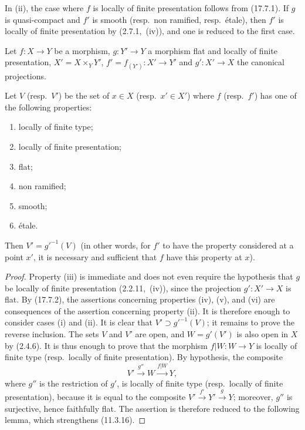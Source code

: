 In (ii), the case where $f$ is locally of finite presentation follows from (17.7.1).
If $g$ is quasi-compact and $f'$ is smooth (resp.\ non ramified, resp.\ \'etale), then $f'$ is locally of finite presentation by (2.7.1,~(iv)), and one is reduced to the first case.

\begin{proposition}[17.7.4]
\label{IV.17.7.4}
Let $f:X\to Y$ be a morphism, $g:Y'\to Y$ a morphism flat and locally of finite presentation, $X'=X\times_Y Y'$, $f'=f_{(Y')}:X'\to Y'$ and $g':X'\to X$ the canonical projections.


Let $V$ (resp.\ $V'$) be the set of $x\in X$ (resp.\ $x'\in X'$) where $f$ (resp.\ $f'$) has one of the following properties:
\begin{enumerate}[label=(\roman*)]
  \item locally of finite type;
  \item locally of finite presentation;
  \item flat;
  \item non ramified;
  \item smooth;
  \item \'etale.
\end{enumerate}
Then $V'=g'^{-1}(V)$ (in other words, for $f'$ to have the property considered at a point $x'$, it is necessary and sufficient that $f$ have this property at $x$).
\end{proposition}

\begin{proof}
Property (iii) is immediate and does not even require the hypothesis that $g$ be locally of finite presentation (2.2.11,~(iv)), since the projection $g':X'\to X$ is flat.
By (17.7.2), the assertions concerning properties (iv), (v), and (vi) are consequences of the assertion concerning property (ii).
It is therefore enough to consider cases (i) and (ii).
It is clear that $V'\supset g'^{-1}(V)$; it remains to prove the reverse inclusion.
The sets $V$ and $V'$ are open, and $W=g'(V')$ is also open in $X$ by (2.4.6).
It is thus enough to prove that the morphism $f|W:W\to Y$ is locally of finite type (resp.\ locally of finite presentation).
By hypothesis, the composite
\[
V'\xrightarrow{g''}W\xrightarrow{f|W}Y,
\]
where $g''$ is the restriction of $g'$, is locally of finite type (resp.\ locally of finite presentation), because it is equal to the composite $V'\xrightarrow{f'}Y'\xrightarrow{g}Y$; moreover, $g''$ is surjective, hence faithfully flat.
The assertion is therefore reduced to the following lemma, which strengthens (11.3.16).
\end{proof}

